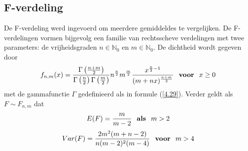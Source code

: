 \documentclass[titlepage]{article}
\numberwithin{equation}{section}
\begin{document}
\subsection{F-verdeling}
De F-verdeling werd ingevoerd om meerdere gemiddeldes te vergelijken. De F-verdelingen vormen bijgevolg een familie van rechtsscheve verdelingen met twee parameters: de vrijheidsgraden $n \in \mathbb{N}_0$ en $m \in \mathbb{N}_0$. De dichtheid wordt gegeven door
\begin{equation}
	f_{n,m}(x) = \frac{\Gamma\left(\frac{n+m}{2}\right)}{\Gamma\left(\frac{n}{2}\right)\Gamma\left(\frac{m}{2}\right)}n^{\frac{n}{2}}m^{\frac{m}{2}}\frac{x^{\frac{n}{2}-1}}{(m+nx)^{\frac{n+m}{2}}} \text{ \textbf{ voor } } x\geq0
	\label{4.32}
\end{equation}
met de gammafunctie $\Gamma$ gedefinieerd als in formule (\ref{4.29}).\newline\newline
Verder geldt als $F\sim F_{n,m}$ dat
\begin{equation}
	E(F) = \frac{m}{m-2} \text{ \textbf{ als } } m>2
	\label{4.33}
\end{equation}
\begin{equation*}
	Var(F) = \frac{2m^2(m+n-2)}{n(m-2)^2(m-4)} \text{ \textbf{ voor } } m > 4
\end{equation*}
\end{document}
